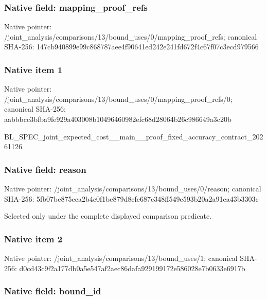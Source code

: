 \documentclass[10pt,a4paper]{article}
\begin{document}
\subsubsection{Native field: mapping\_proof\_refs}


Native pointer: /joint\_analysis/comparis\allowbreak{}ons/13/bound\_uses/0/mapp\allowbreak{}ing\_proof\_refs; canonical SHA-256: 147cb940899e99c868787aee\allowbreak{}4f90641ed242e241fd672f4c\allowbreak{}67f07c3ecd979566



\subsubsection{Native item 1}


Native pointer: /joint\_analysis/comparis\allowbreak{}ons/13/bound\_uses/0/mapp\allowbreak{}ing\_proof\_refs/0; canonical SHA-256: aabbbcc3bfba9fe929a40300\allowbreak{}8b10496460982efc68d28064\allowbreak{}b26c986649a3c20b


BL\_SPEC\_joint\_expected\_c\allowbreak{}ost\_\_main\_\_proof\_fixed\_a\allowbreak{}ccuracy\_contract\_2026112\allowbreak{}6


\subsubsection{Native field: reason}


Native pointer: /joint\_analysis/comparis\allowbreak{}ons/13/bound\_uses/0/reas\allowbreak{}on; canonical SHA-256: 5fb07be875eca2b4c0f1be87\allowbreak{}9d8cfe687c348ff549e593b2\allowbreak{}0a2a91ea43b3303c


Selected only under the complete displayed comparison predicate.


\subsubsection{Native item 2}


Native pointer: /joint\_analysis/comparis\allowbreak{}ons/13/bound\_uses/1; canonical SHA-256: d0cd43c9f2a177db0a5e547a\allowbreak{}f2aec86dafa929199172e586\allowbreak{}028e7b0633e6917b



\subsubsection{Native field: bound\_id}
\end{document}
